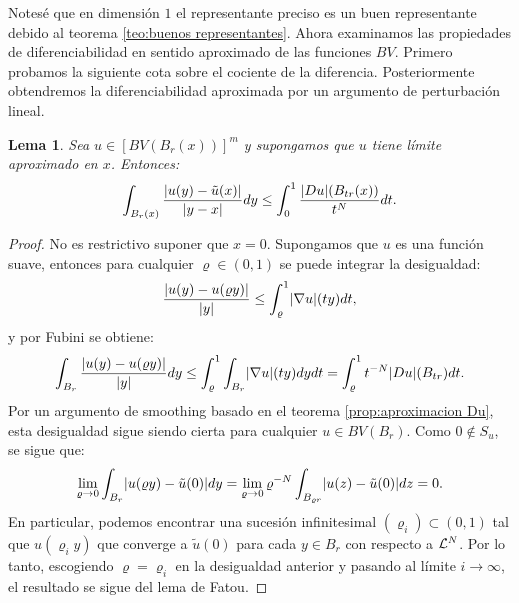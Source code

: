 \documentclass[a4paper,11pt,spanish, twoside, leqno]{tfm-uam}
\newtheorem{lema}[teo]{Lema}
\begin{document}
Notesé que en dimensión $1$ el representante preciso es un buen representante debido al teorema \ref{teo:buenos representantes}. Ahora examinamos las propiedades de diferenciabilidad en sentido aproximado de las funciones $BV$. Primero probamos la siguiente cota sobre el cociente de la diferencia. Posteriormente obtendremos la diferenciabilidad aproximada por un argumento de perturbación lineal.
\begin{lema}\label{lema:teorema de Calderón-Sygmund}
Sea $u\in [BV(B_{r}(x))]^{m}$ y supongamos que $u$ tiene límite aproximado en $x$. Entonces:
\begin{align*}
\int_{B_{r}(x)}\dfrac{\lvert u(y)-\tilde{u}(x)\rvert}{\lvert y-x\rvert}dy\leq \int_{0}^{1}\dfrac{\lvert Du\rvert(B_{tr}(x))}{t^{N}}dt.
\end{align*}
\end{lema}
\begin{proof}
No es restrictivo suponer que $x=0$. Supongamos que $u$ es una función suave, entonces para cualquier $\varrho\in (0,1)$ se puede integrar la desigualdad:
\begin{align*}
\dfrac{\lvert u(y)-u(\varrho y)\rvert}{\lvert y\rvert}\leq \int_{\varrho}^{1}\lvert\nabla{u}\rvert(ty)dt,
\end{align*}
y por Fubini se obtiene:
\begin{align*}
\int_{B_{r}}\dfrac{\lvert u(y)-u(\varrho y)\rvert}{\lvert y\rvert}dy\leq \int_{\varrho}^{1}\int_{B_{r}}\lvert\nabla{u}\rvert(ty)dydt=\int_{\varrho}^{1}t^{-N}\lvert Du\rvert(B_{tr})dt.
\end{align*}
Por un argumento de smoothing basado en el teorema \ref{prop:aproximacion Du}, esta desigualdad sigue siendo cierta para cualquier $u\in BV(B_{r})$. Como $0\not \in S_{u}$, se sigue que:
\begin{align*}
\lim_{\varrho\to 0}\int_{B_{r}}\lvert u(\varrho y)-\tilde{u}(0)\rvert dy=\lim_{\varrho\to 0}\varrho^{-N}\int_{B_{\varrho r}}\lvert u(z)-\tilde{u}(0)\rvert dz=0.
\end{align*}
En particular, podemos encontrar una sucesión infinitesimal $(\varrho_{i})\subset (0,1)$ tal que $u(\varrho_{i}y)$ que converge a $\tilde{u}(0)$ para cada $y\in B_{r}$ con respecto a $\mathcal{L}^{N}$. Por lo tanto, escogiendo $\varrho=\varrho_{i}$ en la desigualdad anterior y pasando al límite $i\to \infty$, el resultado se sigue del lema de Fatou.
\end{proof}
\end{document}
